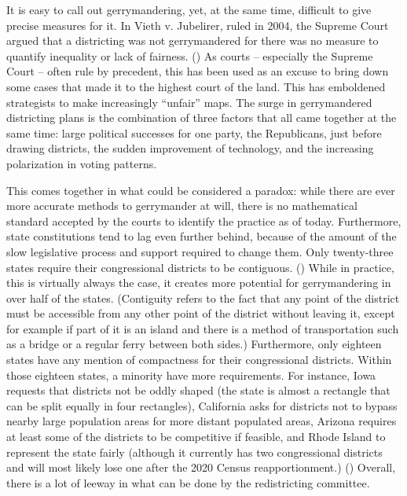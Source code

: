 \documentclass[letterpaper]{article}
\begin{document}
It is easy to call out gerrymandering, yet, at the same time, difficult to give precise measures for it. In Vieth v. Jubelirer, ruled in 2004, the Supreme Court argued that a districting was not gerrymandered for there was no measure to quantify inequality or lack of fairness. (\cite{vieth}) As courts – especially the Supreme Court – often rule by precedent, this has been used as an excuse to bring down some cases that made it to the highest court of the land. This has emboldened strategists to make increasingly “unfair” maps. The surge in gerrymandered districting plans is the combination of three factors that all came together at the same time: large political successes for one party, the Republicans, just before drawing districts, the sudden improvement of technology, and the increasing polarization in voting patterns.


This comes together in what could be considered a paradox: while there are ever more accurate methods to gerrymander at will, there is no mathematical standard accepted by the courts to identify the practice as of today. Furthermore, state constitutions tend to lag even further behind, because of the amount of the slow legislative process and support required to change them. Only twenty-three states require their congressional districts to be contiguous. (\cite{contiguity}) While in practice, this is virtually always the case, it creates more potential for gerrymandering in over half of the states. (Contiguity refers to the fact that any point of the district must be accessible from any other point of the district without leaving it, except for example if part of it is an island and there is a method of transportation such as a bridge or a regular ferry between both sides.) Furthermore, only eighteen states have any mention of compactness for their congressional districts. Within those eighteen states, a minority have more requirements. For instance, Iowa requests that districts not be oddly shaped (the state is almost a rectangle that can be split equally in four rectangles), California asks for districts not to bypass nearby large population areas for more distant populated areas, Arizona requires at least some of the districts to be competitive if feasible, and Rhode Island to represent the state fairly (although it currently has two congressional districts and will most likely lose one after the 2020 Census reapportionment.) (\cite{contiguity}) Overall, there is a lot of leeway in what can be done by the redistricting committee. 
\end{document}

